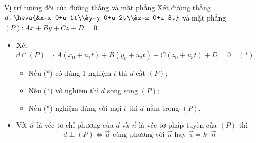 \begin{dang}{Vị trí tương đối của đường thẳng và mặt phẳng}
	Xét đường thẳng $d \colon \heva{&x=x_0+u_1t\\&y=y_0+u_2t\\&z=z_0+u_3t}$ và mặt phẳng $(P) \colon Ax + By + Cz + D =0$.
	\begin{itemize}
		\item [\iconMT]  Xét $d \cap (P) \Rightarrow A(x_0+u_1t)+B(y_0+u_2t)+C(z_0+u_3t)+D=0 \quad (*)$
		\begin{boxdn}
			\begin{itemize}
				\item [$\bullet$] Nếu (*) có đúng 1 nghiệm $t$ thì $d$ cắt $(P)$;
				\item [$\bullet$] Nếu (*) vô nghiệm  thì $d$ song song $(P)$;
				\item [$\bullet$] Nếu (*) nghiệm đúng với mọi $t$ thì $d$ nằm trong $(P)$.
			\end{itemize}
		\end{boxdn}
		\item [\iconMT]  Với $\vec{u}$ là véc tơ chỉ phương của $d$ và $\vec{n}$ là véc tơ pháp tuyến của $(P)$ thì
		$$d \perp (P) \Leftrightarrow \vec{u} \text{ cùng phương với } \vec{n} \text{ hay } \vec{u}=k \cdot\vec{n}$$
	\end{itemize}
\end{dang}
\setcounter{vd}{0}

